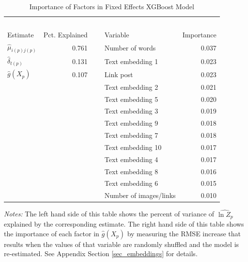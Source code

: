 \begin{table}[H]
\centering
\caption{Importance of Factors in Fixed Effects XGBoost Model} 
\vspace{0.2cm}
\label{tbl_xgboost_factors}
\begin{threeparttable}
\begin{tabular}{lrclr} 
\toprule
{} & ~ &  \\   
Estimate & Pct. Explained & ~ & Variable & Importance \\ 
\midrule
$\hat{\mu}_{i(p)j(p)}$ & 0.761 & ~ & Number of words & 0.037 \\
$\hat{\delta}_{t(p)}$ & 0.131 & ~ & Text embedding 1 & 0.023 \\
$\hat{g}(X_{p})$ & 0.107 & ~ & Link post & 0.023 \\
 & & ~ & Text embedding 2 & 0.021 \\
 & & ~ & Text embedding 5 & 0.020 \\
 & & ~ & Text embedding 3 & 0.019 \\
 & & ~ & Text embedding 9 & 0.018 \\
 & & ~ & Text embedding 7 & 0.018 \\
 & & ~ & Text embedding 10 & 0.017 \\
 & & ~ & Text embedding 4 & 0.017 \\
 & & ~ & Text embedding 8 & 0.016 \\
 & & ~ & Text embedding 6 & 0.015 \\
 & & ~ & Number of images/links & 0.010 \\
\bottomrule
\end{tabular} 
\begin{tablenotes}[flushleft]
\footnotesize
\item \textit{Notes:} The left hand side of this table shows the percent of variance of $\widehat{\ln Z_p}$ explained by the corresponding estimate. The right hand side of this table shows the importance of each factor in $\hat{g}(X_p)$ by measuring the RMSE increase that results when the values of that variable are randomly shuffled and the model is re-estimated. See Appendix Section \ref{sec_embeddings} for details.
\end{tablenotes}
\end{threeparttable}
\end{table}
